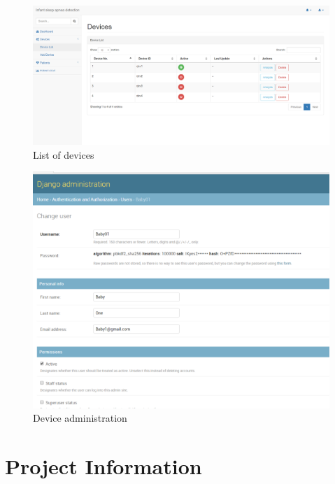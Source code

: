 \documentclass{report}
\begin{document}
\begin{figure}[h]
    \centering
    \includegraphics[scale=0.3]{listdevice.png}
    \caption{List of devices}
    \label{fig:List of devices}
\end{figure}

\begin{figure}[h]
    \centering
    \includegraphics{deviceAdmin.png}
    \caption{Device administration}
    \label{fig:Device administration}
\end{figure}



\chapter{Project Information}
\end{document}
